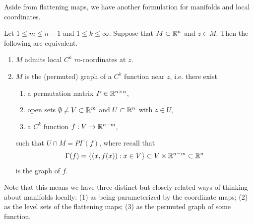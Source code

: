 \documentclass[a4paper]{article}
\begin{document}
Aside from flattening maps, we have another formulation 
for manifolds and local coordinates.
\begin{thm}
Let $1 \leq m \leq n-1$ and $1 \leq k \leq \infty$.
Suppose that $M \subset \mathbb{R}^n$ and $z \in M$. Then 
the following are equivalent.
\begin{enumerate}
\item $M$ admits local $C^k$ $m$-coordinates at $z$.
\item $M$ is the (permuted) graph of a $C^k$ function near
$z$, i.e. there exist
\begin{enumerate}
\item a permutation matrix $P \in \mathbb{R}^{n \times n}$,
\item open sets $\emptyset \neq V \subset \mathbb{R}^m$ and
$U \subset \mathbb{R}^n$ with $z \in U$,
\item a $C^k$ function $f : V \to \mathbb{R}^{n-m}$,
\end{enumerate}
such that $U \cap M = P \Gamma(f)$, where recall that
\[
\Gamma(f) = \{(x,f(x)) : x \in V\} \subset V \times
\mathbb{R}^{n-m} \subset \mathbb{R}^n
\]
is the graph of $f$.
\end{enumerate}
\end{thm}

Note that this means we have three distinct but closely
related ways of thinking about manifolds locally:
(1) as being parameterized by the coordinate maps;
(2) as the level sets of the flattening maps;
(3) as the permuted graph of some function.
\end{document}
